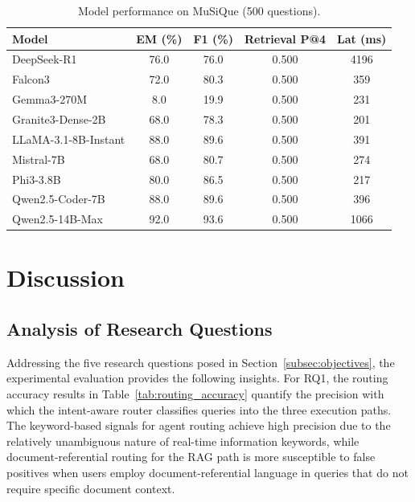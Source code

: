 \documentclass[12pt,a4paper]{article}
\begin{document}
\begin{table}[htbp]
  \centering
  \caption{Model performance on MuSiQue (500 questions).}
  \label{tab:musique}
  \begin{tabular}{lcccc}
    \hline
    \textbf{Model}
      & \textbf{EM (\%)}
      & \textbf{F1 (\%)}
      & \textbf{Retrieval P@4}
      & \textbf{Lat (ms)} \\
    \hline
    DeepSeek-R1            & 76.0 & 76.0 & 0.500 & 4196 \\
    Falcon3                & 72.0 & 80.3 & 0.500 &  359 \\
    Gemma3-270M            &  8.0 & 19.9 & 0.500 &  231 \\
    Granite3-Dense-2B      & 68.0 & 78.3 & 0.500 &  201 \\
    LLaMA-3.1-8B-Instant   & 88.0 & 89.6 & 0.500 &  391 \\
    Mistral-7B             & 68.0 & 80.7 & 0.500 &  274 \\
    Phi3-3.8B              & 80.0 & 86.5 & 0.500 &  217 \\
    Qwen2.5-Coder-7B       & 88.0 & 89.6 & 0.500 &  396 \\
    Qwen2.5-14B-Max        & 92.0 & 93.6 & 0.500 & 1066 \\
    \hline
  \end{tabular}
\end{table}

\section{Discussion}
\label{sec:discussion}

\subsection{Analysis of Research Questions}
\label{subsec:rq_analysis}

Addressing the five research questions posed in Section~\ref{subsec:objectives}, the experimental evaluation provides the following insights. For RQ1, the routing accuracy results in Table~\ref{tab:routing_accuracy} quantify the precision with which the intent-aware router classifies queries into the three execution paths. The keyword-based signals for agent routing achieve high precision due to the relatively unambiguous nature of real-time information keywords, while document-referential routing for the RAG path is more susceptible to false positives when users employ document-referential language in queries that do not require specific document context.
\end{document}
